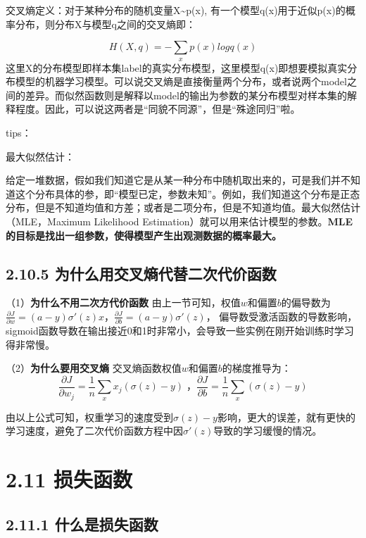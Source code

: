 交叉熵定义：对于某种分布的随机变量X\textasciitilde{}p(x),
有一个模型q(x)用于近似p(x)的概率分布，则分布X与模型q之间的交叉熵即：

\[
H(X,q)=-\sum_{x}p(x)logq(x)
\]
这里X的分布模型即样本集label的真实分布模型，这里模型q(x)即想要模拟真实分布模型的机器学习模型。可以说交叉熵是直接衡量两个分布，或者说两个model之间的差异。而似然函数则是解释以model的输出为参数的某分布模型对样本集的解释程度。因此，可以说这两者是``同貌不同源''，但是``殊途同归''啦。

tips：

最大似然估计：

给定一堆数据，假如我们知道它是从某一种分布中随机取出来的，可是我们并不知道这个分布具体的参，即``模型已定，参数未知''。例如，我们知道这个分布是正态分布，但是不知道均值和方差；或者是二项分布，但是不知道均值。最大似然估计（MLE，Maximum
Likelihood
Estimation）就可以用来估计模型的参数。\textbf{MLE的目标是找出一组参数，使得模型产生出观测数据的概率最大。}

\subsection{2.10.5
为什么用交叉熵代替二次代价函数}\label{ux4e3aux4ec0ux4e48ux7528ux4ea4ux53c9ux71b5ux4ee3ux66ffux4e8cux6b21ux4ee3ux4ef7ux51fdux6570}

（1）\textbf{为什么不用二次方代价函数}
由上一节可知，权值$w$和偏置$b$的偏导数为$\frac{\partial J}{\partial w}=(a-y)\sigma'(z)x$，$\frac{\partial J}{\partial b}=(a-y)\sigma'(z)$，
偏导数受激活函数的导数影响，sigmoid函数导数在输出接近0和1时非常小，会导致一些实例在刚开始训练时学习得非常慢。

（2）\textbf{为什么要用交叉熵}
交叉熵函数权值$w$和偏置$b$的梯度推导为： \[
\frac{\partial J}{\partial w_j}=\frac{1}{n}\sum_{x}x_j(\sigma{(z)}-y)\;，
\frac{\partial J}{\partial b}=\frac{1}{n}\sum_{x}(\sigma{(z)}-y)
\]

由以上公式可知，权重学习的速度受到$\sigma{(z)}-y$影响，更大的误差，就有更快的学习速度，避免了二次代价函数方程中因$\sigma'{(z)}$导致的学习缓慢的情况。

\section{2.11 损失函数}\label{ux635fux5931ux51fdux6570}

\subsection{2.11.1
什么是损失函数}\label{ux4ec0ux4e48ux662fux635fux5931ux51fdux6570}

